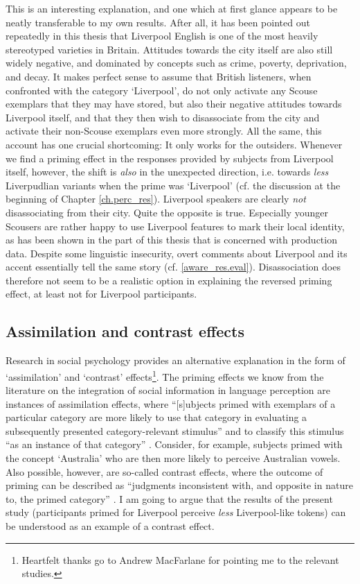 This is an interesting explanation, and one which at first glance appears to be neatly transferable to my own results.
After all, it has been pointed out repeatedly in this thesis that Liverpool English is one of the most heavily stereotyped varieties in Britain.
Attitudes towards the city itself are also still widely negative, and dominated by concepts such as crime, poverty, deprivation, and decay.
It makes perfect sense to assume that British listeners, when confronted with the category `Liverpool', do not only activate any Scouse exemplars that they may have stored, but also their negative attitudes towards Liverpool itself, and that they then wish to disassociate from the city and activate their non-Scouse exemplars even more strongly.
All the same, this account has one crucial shortcoming: It only works for the outsiders.
Whenever we find a priming effect in the responses provided by subjects from Liverpool itself, however, the shift is \emph{also} in the unexpected direction, i.e. towards \emph{less} Liverpudlian variants when the prime was `Liverpool' (cf. the discussion at the beginning of Chapter \ref{ch.perc_res}).
Liverpool speakers are clearly \emph{not} disassociating from their city.
Quite the opposite is true.
Especially younger Scousers are rather happy to use Liverpool features to mark their local identity, as has been shown in the part of this thesis that is concerned with production data.
Despite some linguistic insecurity, overt comments about Liverpool and its accent essentially tell the same story (cf. \ref{aware_res.eval}).
Disassociation does therefore not seem to be a realistic option in explaining the reversed priming effect, at least not for Liverpool participants.

		\subsection{Assimilation and contrast effects}

Research in social psychology provides an alternative explanation in the form of `assimilation' and `contrast' effects\footnote{Heartfelt thanks go to Andrew MacFarlane for pointing me to the relevant studies.}.
The priming effects we know from the literature on the integration of social information in language perception are instances of assimilation effects, where ``[s]ubjects primed with exemplars of a particular category are more likely to use that category in evaluating a subsequently presented category-relevant stimulus'' and to classify this stimulus ``as an instance of that category'' \parencite[1106--1107]{herr1986}.
Consider, for example, subjects primed with the concept `Australia' who are then more likely to perceive Australian vowels.
Also possible, however, are so-called contrast effects, where the outcome of priming can be described as ``judgments inconsistent with, and opposite in nature to, the primed category'' \parencite[1107]{herr1986}.
I am going to argue that the results of the present study (participants primed for Liverpool perceive \emph{less} Liverpool-like tokens) can be understood as an example of a contrast effect.

